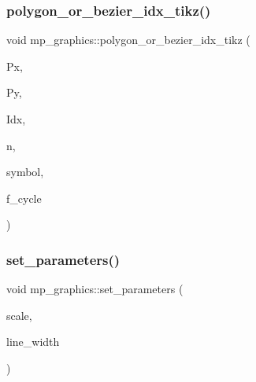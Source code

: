 \mbox{\label{classmp__graphics_ae266ecef91f4cd8a6fd4054b17354370}} 
\subsubsection{\texorpdfstring{polygon\+\_\+or\+\_\+bezier\+\_\+idx\+\_\+tikz()}{polygon\_or\_bezier\_idx\_tikz()}}
{\footnotesize\ttfamily void mp\+\_\+graphics\+::polygon\+\_\+or\+\_\+bezier\+\_\+idx\+\_\+tikz (\begin{DoxyParamCaption}\item[{\mbox{\hyperlink{galois_8h_a09fddde158a3a20bd2dcadb609de11dc}{I\+NT}} $\ast$}]{Px,  }\item[{\mbox{\hyperlink{galois_8h_a09fddde158a3a20bd2dcadb609de11dc}{I\+NT}} $\ast$}]{Py,  }\item[{\mbox{\hyperlink{galois_8h_a09fddde158a3a20bd2dcadb609de11dc}{I\+NT}} $\ast$}]{Idx,  }\item[{\mbox{\hyperlink{galois_8h_a09fddde158a3a20bd2dcadb609de11dc}{I\+NT}}}]{n,  }\item[{const char $\ast$}]{symbol,  }\item[{\mbox{\hyperlink{galois_8h_a09fddde158a3a20bd2dcadb609de11dc}{I\+NT}}}]{f\+\_\+cycle }\end{DoxyParamCaption})}

\mbox{\label{classmp__graphics_a809f6dd08b804bf41afbc7855975d212}} 
\subsubsection{\texorpdfstring{set\+\_\+parameters()}{set\_parameters()}}
{\footnotesize\ttfamily void mp\+\_\+graphics\+::set\+\_\+parameters (\begin{DoxyParamCaption}\item[{double}]{scale,  }\item[{double}]{line\+\_\+width }\end{DoxyParamCaption})}

